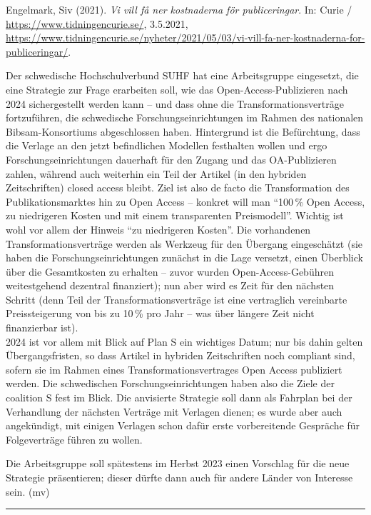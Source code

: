 \documentclass[a4paper,
fontsize=11pt,
oneside,
numbers=noperiodatend,
parskip=half-,
bibliography=totoc,
final
]{scrartcl}
\begin{document}
Engelmark, Siv (2021). \emph{Vi vill få ner kostnaderna för
publiceringar}. In: Curie / \url{https://www.tidningencurie.se/},
3.5.2021,
\url{https://www.tidningencurie.se/nyheter/2021/05/03/vi-vill-fa-ner-kostnaderna-for-publiceringar/}.

Der schwedische Hochschulverbund SUHF hat eine Arbeitsgruppe eingesetzt,
die eine Strategie zur Frage erarbeiten soll, wie das
Open-Access-Publizieren nach 2024 sichergestellt werden kann -- und dass
ohne die Transformationsverträge fortzuführen, die schwedische
Forschungseinrichtungen im Rahmen des nationalen Bibsam-Konsortiums
abgeschlossen haben. Hintergrund ist die Befürchtung, dass die Verlage
an den jetzt befindlichen Modellen festhalten wollen und ergo
Forschungseinrichtungen dauerhaft für den Zugang und das OA-Publizieren
zahlen, während auch weiterhin ein Teil der Artikel (in den hybriden
Zeitschriften) closed access bleibt. Ziel ist also de facto die
Transformation des Publikationsmarktes hin zu Open Access -- konkret
will man \enquote{100\,\% Open Access, zu niedrigeren Kosten und mit
einem transparenten Preismodell}. Wichtig ist wohl vor allem der Hinweis
\enquote{zu niedrigeren Kosten}. Die vorhandenen Transformationsverträge
werden als Werkzeug für den Übergang eingeschätzt (sie haben die
Forschungseinrichtungen zunächst in die Lage versetzt, einen Überblick
über die Gesamtkosten zu erhalten -- zuvor wurden Open-Access-Gebühren
weitestgehend dezentral finanziert); nun aber wird es Zeit für den
nächsten Schritt (denn Teil der Transformationsverträge ist eine
vertraglich vereinbarte Preissteigerung von bis zu 10\,\% pro Jahr --
was über längere Zeit nicht finanzierbar ist).\\
2024 ist vor allem mit Blick auf Plan S ein wichtiges Datum; nur bis
dahin gelten Übergangsfristen, so dass Artikel in hybriden Zeitschriften
noch compliant sind, sofern sie im Rahmen eines Transformationsvertrages
Open Access publiziert werden. Die schwedischen Forschungseinrichtungen
haben also die Ziele der coalition S fest im Blick. Die anvisierte
Strategie soll dann als Fahrplan bei der Verhandlung der nächsten
Verträge mit Verlagen dienen; es wurde aber auch angekündigt, mit
einigen Verlagen schon dafür erste vorbereitende Gespräche für
Folgeverträge führen zu wollen.

Die Arbeitsgruppe soll spätestens im Herbst 2023 einen Vorschlag für die
neue Strategie präsentieren; dieser dürfte dann auch für andere Länder
von Interesse sein. (mv)

\begin{center}\rule{0.5\linewidth}{0.5pt}\end{center}
\end{document}
